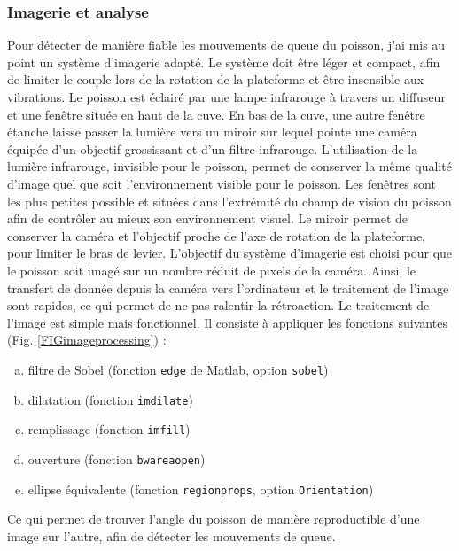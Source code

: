 \subsubsection{Imagerie et analyse}
Pour détecter de manière fiable les mouvements de queue du poisson, j'ai mis au point un système d'imagerie adapté. Le système doit être léger et compact, afin de limiter le couple lors de la rotation de la plateforme et être insensible aux vibrations. Le poisson est éclairé par une lampe infrarouge à travers un diffuseur et une fenêtre située en haut de la cuve. En bas de la cuve, une autre fenêtre étanche laisse passer la lumière vers un miroir sur lequel pointe une caméra équipée d'un objectif grossissant et d'un filtre infrarouge. L'utilisation de la lumière infrarouge, invisible pour le poisson, permet de conserver la même qualité d'image quel que soit l'environnement visible pour le poisson. Les fenêtres sont les plus petites possible et situées dans l'extrémité du champ de vision du poisson afin de contrôler au mieux son environnement visuel. Le miroir permet de conserver la caméra et l'objectif proche de l'axe de rotation de la plateforme, pour limiter le bras de levier.
L'objectif du système d'imagerie est choisi pour que le poisson soit imagé sur un nombre réduit de pixels de la caméra. Ainsi, le transfert de donnée depuis la caméra vers l'ordinateur et le traitement de l'image sont rapides, ce qui permet de ne pas ralentir la rétroaction. Le traitement de l'image est simple mais fonctionnel. Il consiste à appliquer les fonctions suivantes (Fig. \ref{FIGimageprocessing}) :

\begin{enumerate}[a)] \itemsep0em \setcounter{enumi}{1}
    \item filtre de Sobel (fonction \verb|edge| de Matlab, option \verb|sobel|)
    \item dilatation (fonction \verb|imdilate|)
    \item remplissage (fonction \verb|imfill|)
    \item ouverture (fonction \verb|bwareaopen|)
    \item ellipse équivalente (fonction \verb|regionprops|, option \verb|Orientation|)
\end{enumerate}

Ce qui permet de trouver l'angle du poisson de manière reproductible d'une image sur l'autre, afin de détecter les mouvements de queue.

